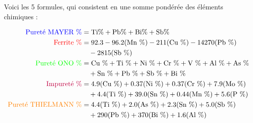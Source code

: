 \documentclass[12pt]{article}
\begin{document}
Voici les 5 formules, qui consistent en une somme pondérée des éléments chimiques :




\begin{align*}
    \textcolor{blue}{\text{Pureté MAYER \%}} &= \text{Ti\%} + \text{Pb\%} + \text{Bi\%} + \text{Sb\%} \\
    \textcolor{red}{\text{Ferrite \%}} &= 92.3 - 96.2 (\text{Mn \%}) - 211 (\text{Cu \%}) - 14270 (\text{Pb \%}) \\
    &\quad - 2815 (\text{Sb \%}) \\
    \textcolor{green}{\text{Pureté ONO \%}} &= \text{Cu \%} + \text{Ti \%} + \text{Ni \%} + \text{Cr \%} + \text{V \%} + \text{Al \%} + \text{As \%} \\
    &\quad + \text{Sn \%} + \text{Pb \%} + \text{Sb \%} + \text{Bi \%} \\
    \textcolor{purple}{\text{Impureté \%}} &= 4.9 (\text{Cu \%}) + 0.37 (\text{Ni \%}) + 0.37 (\text{Cr \%}) + 7.9 (\text{Mo \%}) \\
    &\quad + 4.4 (\text{Ti \%}) + 39.0 (\text{Sn \%}) + 0.44 (\text{Mn \%}) + 5.6 (\text{P \%}) \\
    \textcolor{orange}{\text{Pureté THIELMANN \%}} &= 4.4 (\text{Ti \%}) + 2.0 (\text{As \%}) + 2.3 (\text{Sn \%}) + 5.0 (\text{Sb \%}) \\
    &\quad + 290 (\text{Pb \%}) + 370 (\text{Bi \%}) + 1.6 (\text{Al \%})
\end{align*}
    
   
    
\end{document}

